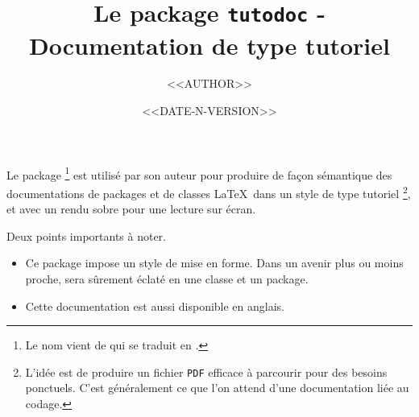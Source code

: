 \documentclass[12pt, a4paper]{article}
\begin{document}
\title{Le package \texttt{tutodoc} - Documentation de type tutoriel}
\author{<<AUTHOR>>}
\date{<<DATE-N-VERSION>>}

\maketitle

Le package 
\footnote{
    Le nom vient de  qui se traduit en .
}
est utilisé par son auteur pour produire de façon sémantique des documentations de packages et de classes \LaTeX\ dans un style de type tutoriel
\footnote{
    L'idée est de produire un fichier \texttt{PDF} efficace à parcourir pour des besoins ponctuels. C'est généralement ce que l'on attend d'une documentation liée au codage.
},
et avec un rendu sobre pour une lecture sur écran.

\medskip

\noindent
Deux points importants à noter.
\begin{itemize}
    \item Ce package impose un style de mise en forme. Dans un avenir plus ou moins proche,  sera sûrement éclaté en une classe et un package.

    \item Cette documentation est aussi disponible en anglais.
\end{itemize}
\end{document}
